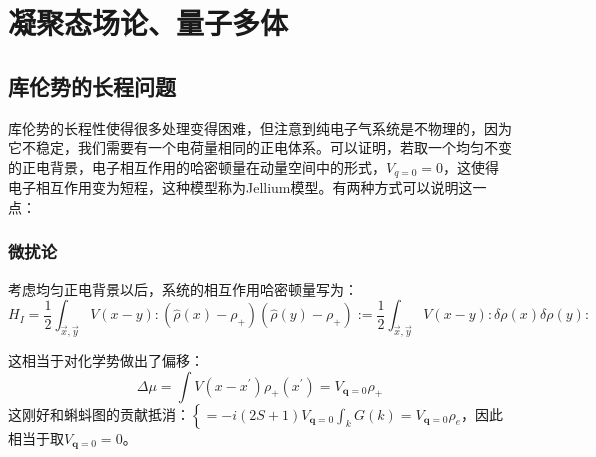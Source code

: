 \documentclass[10pt,openany]{book}
\theoremstyle{thmstyle} %
\theoremstyle{defstyle} %
\theoremstyle{prostyle} %
\begin{document}
\chapter{凝聚态场论、量子多体}
\section{库伦势的长程问题}
库伦势的长程性使得很多处理变得困难，但注意到纯电子气系统是不物理的，因为它不稳定，我们需要有一个电荷量相同的正电体系。可以证明，若取一个均匀不变的正电背景，电子相互作用的哈密顿量在动量空间中的形式，$ V_{q=0}=0 $，这使得电子相互作用变为短程，这种模型称为Jellium模型。有两种方式可以说明这一点：
\subsection*{微扰论}
考虑均匀正电背景以后，系统的相互作用哈密顿量写为：
\begin{equation}
	H_I=\frac{1}{2} \int_{\vec{x}, \vec{y}} V(x-y):\left(\hat{\rho}(x)-\rho_{+}\right)\left(\hat{\rho}(y)-\rho_{+}\right):=\frac{1}{2} \int_{\vec{x}, \vec{y}} V(x-y): \delta \rho(x) \delta \rho(y):
\end{equation} 

这相当于对化学势做出了偏移：
\begin{equation}
	\Delta \mu=\int V\left(x-x^{\prime}\right) \rho_{+}\left(x^{\prime}\right)=V_{\mathbf{q}=0} \rho_{+}
\end{equation}
这刚好和蝌蚪图的贡献抵消：$ \left\{=-i(2 S+1) V_{\mathbf{q}=0} \int_k G(k)=V_{\mathbf{q}=0} \rho_e\right.  $，因此相当于取$ V_{\mathbf{q}=0}=0 $。
\end{document}
